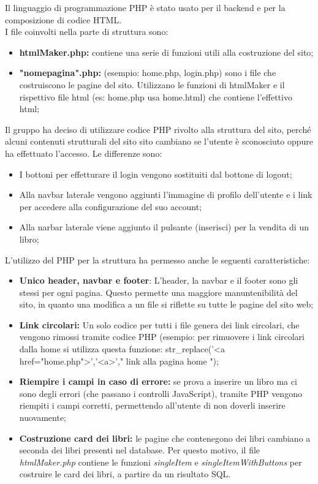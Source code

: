 Il linguaggio di programmazione PHP è stato usato per il backend e per la composizione di codice HTML.\\
I file coinvolti nella parte di struttura sono:
\begin{itemize}
    \item \textbf{htmlMaker.php:} contiene una serie di funzioni utili alla costruzione del sito;
    \item \textbf{"nomepagina".php:} (esempio: home.php, login.php) sono i file che costruiscono le pagine del sito. Utilizzano le funzioni di htmlMaker e il rispettivo file html (es: home.php usa home.html) che contiene l'effettivo html; 
\end{itemize}
Il gruppo ha deciso di utilizzare codice PHP rivolto alla struttura del sito, perché alcuni contenuti strutturali del sito sito cambiano se l'utente è sconosciuto oppure ha effettuato l'accesso. Le differenze sono:
\begin{itemize}
    \item I bottoni per effetturare il login vengono sostituiti dal bottone di logout;
    \item Alla navbar laterale vengono aggiunti l'immagine di profilo dell'utente e i link per accedere alla configurazione del suo account;
    \item Alla narbar laterale viene aggiunto il pulsante (inserisci) per la vendita di un libro;
\end{itemize}
L'utilizzo del PHP per la struttura ha permesso anche le seguenti caratteristiche:
\begin{itemize}
    \item \textbf{Unico header, navbar e footer}: L'header, la navbar e il footer sono gli stessi per ogni pagina. Questo permette una maggiore manuntenibilità del sito, in quanto una modifica a un file si riflette su tutte le pagine del sito web;
    \item \textbf{Link circolari:} Un solo codice per tutti i file genera dei link circolari, che vengono rimossi tramite codice PHP (esempio: per rimuovere i link circolari dalla home si utilizza questa funzione: str\_replace('<a href="home.php">','<a>',"\- link alla pagina home \-");
    \item \textbf{Riempire i campi in caso di errore:} se prova a inserire un libro ma ci sono degli errori (che passano i controlli JavaScript), tramite PHP vengono riempiti i campi corretti, permettendo all'utente di non doverli inserire nuovamente;
    \item \textbf{Costruzione card dei libri:} le pagine che contenegono dei libri cambiano a seconda dei libri presenti nel database. Per questo motivo, il file \textit{htmlMaker.php} contiene le funzioni \textit{singleItem} e \textit{singleItemWithButtons} per costruire le card dei libri, a partire da un risultato SQL.
\end{itemize}
